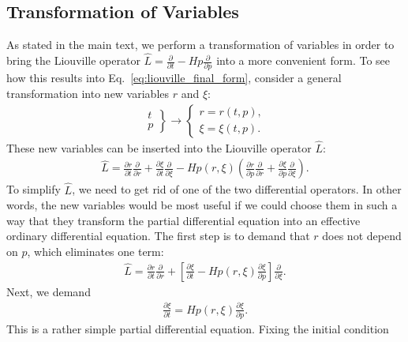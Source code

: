 \subsection{\label{app:transf_variables}Transformation of Variables}

As stated in the main text, we perform a transformation of variables in order to bring the Liouville operator $\hat{L} = \frac{\partial}{\partial t} - H p \frac{\partial}{\partial p}$ into a more convenient form. To see how this results into Eq.~\eqref{eq:liouville_final_form}, consider a general transformation into new variables $r$ and $\xi$:
\begin{align}
 \left.
 \begin{matrix}
 t\\
 p
 \end{matrix} \right\} \to \left\{
 \begin{matrix}
 r = r(t, p),\\
 \xi = \xi (t,p).
 \end{matrix} \right.
\end{align}
These new variables can be inserted into the Liouville operator $\hat{L}$:
\begin{align}
\hat{L} = \frac{\partial r}{\partial t} \frac{\partial }{\partial r} +  \frac{\partial \xi}{\partial t} \frac{\partial }{\partial \xi}- H p(r,\xi) \left(  \frac{\partial r}{\partial p} \frac{\partial}{\partial r}+ \frac{\partial \xi}{\partial p} \frac{\partial}{\partial \xi} \right).
\end{align}
To simplify $\hat{L}$, we need to get rid of one of the two differential operators. In other words, the new variables would be most useful if we could choose them in such a way that they transform the partial differential equation into an effective ordinary differential equation. The first step is to demand that $r$ does not depend on $p$, which eliminates one term:
\begin{align}
\hat{L}=\frac{\partial r}{\partial t} \frac{\partial }{\partial r} +  \left[ \frac{\partial \xi}{\partial t} - H p(r,\xi)  \frac{\partial \xi}{\partial p}\right] \frac{\partial}{\partial \xi}.
\end{align}
Next, we demand
\begin{align}
\frac{\partial \xi}{\partial t}  =  H p(r,\xi)  \frac{\partial \xi}{\partial p} .
\end{align}
This is a rather simple partial differential equation. Fixing the initial condition
